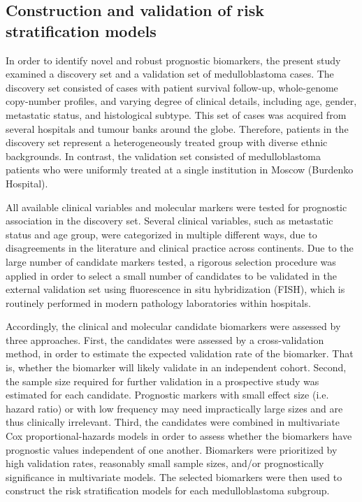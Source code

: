\subsection{Construction and validation of risk stratification models}

In order to identify novel and robust prognostic biomarkers, the present study examined a discovery set and a validation set of medulloblastoma cases. The discovery set consisted of cases with patient survival follow-up, whole-genome copy-number profiles, and varying degree of clinical details, including age, gender, metastatic status, and histological subtype. This set of cases was acquired from several hospitals and tumour banks around the globe. Therefore, patients in the discovery set represent a heterogeneously treated group with diverse ethnic backgrounds. In contrast, the validation set consisted of medulloblastoma patients who were uniformly treated at a single institution in Moscow (Burdenko Hospital).

All available clinical variables and molecular markers were tested for prognostic association in the discovery set. Several clinical variables, such as metastatic status and age group, were categorized in multiple different ways, due to disagreements in the literature and clinical practice across continents. Due to the large number of candidate markers tested, a rigorous selection procedure was applied in order to select a small number of candidates to be validated in the external validation set using fluorescence in situ hybridization (FISH), which is routinely performed in modern pathology laboratories within hospitals.

Accordingly, the clinical and molecular candidate biomarkers were assessed by three approaches. First, the candidates were assessed by a cross-validation method, in order to estimate the expected validation rate of the biomarker. That is, whether the biomarker will likely validate in an independent cohort. Second, the sample size required for further validation in a prospective study was estimated for each candidate. Prognostic markers with small effect size (i.e. hazard ratio) or with low frequency may need impractically large sizes and are thus clinically irrelevant. Third, the candidates were combined in multivariate Cox proportional-hazards models in order to assess whether the biomarkers have prognostic values independent of one another. Biomarkers were prioritized by high validation rates, reasonably small sample sizes, and/or prognostically significance in multivariate models. The selected biomarkers were then used to construct the risk stratification models for each medulloblastoma subgroup.

